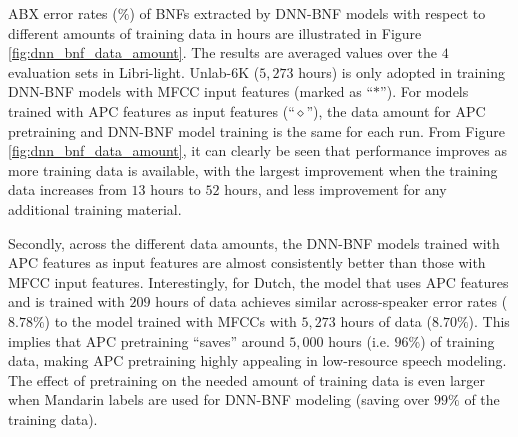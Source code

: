 \documentclass[a4paper]{article}
\begin{document}
ABX error rates ($\%$) of BNFs extracted by  DNN-BNF models with respect to different amounts of training data in hours are illustrated in Figure \ref{fig:dnn_bnf_data_amount}. The results are averaged values over the $4$ evaluation sets in  Libri-light. Unlab-6K ($5,273$ hours)  is only adopted in training DNN-BNF models with MFCC input features (marked as ``$\ast$''). For models trained with APC features as input features (``$\diamond$''), the  data amount for APC pretraining and DNN-BNF model training   is the same for each run.  From Figure \ref{fig:dnn_bnf_data_amount}, it can clearly be seen that 
performance improves as more training data is available, with the largest improvement when the training data increases from $13$  hours  to $52$ hours, and less improvement for any additional training material.

Secondly, across the different data amounts, the DNN-BNF models trained with APC features as input features are almost consistently better than those with MFCC input features. 
Interestingly, for Dutch, the model that uses APC features and is trained with $209$ hours of data achieves similar across-speaker error rates ($8.78\%$) to the model trained with MFCCs with $5,273$ hours of data ($8.70\%$). This implies that APC pretraining ``saves'' around $5,000$ hours (i.e.  $96\%$) of training data, making APC pretraining highly appealing in low-resource speech modeling. The effect of pretraining on the needed amount of training data is even larger when Mandarin labels are used for DNN-BNF modeling (saving over $99\%$ of the training data).
\end{document}
